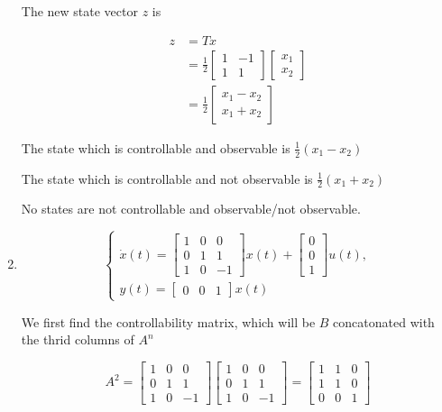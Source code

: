\documentclass{article}
\begin{document}
\begin{enumerate}[label=\alph*)]
The new state vector $z$ is

\begin{align*}
    z & = T x \\
    &= \frac{1}{2}
    \begin{bmatrix}
        1 & -1 \\
        1 & 1
    \end{bmatrix}
    \begin{bmatrix}
        x_1 \\
        x_2
    \end{bmatrix} \\
    &= \frac{1}{2}
    \begin{bmatrix}
        x_1 - x_2 \\
        x_1 + x_2
    \end{bmatrix}
\end{align*}

The state which is controllable and observable is $\frac{1}{2}(x_1 - x_2)$

The state which is controllable and not observable is $\frac{1}{2}(x_1 + x_2)$

No states are not controllable and observable/not observable.

\item 

\[
\left\{
    \begin{array}{l}
        \dot x(t) = 
        \begin{bmatrix}
            1 & 0 & 0 \\
            0 & 1 & 1 \\
            1 & 0 & -1 
        \end{bmatrix}
        x(t) + 
        \begin{bmatrix}
            0 \\
            0 \\
            1
        \end{bmatrix}
        u(t), \\
        y(t) = 
        \begin{bmatrix}
            0 & 0 & 1
        \end{bmatrix}
        x(t)
    \end{array}
\right.
\]

We first find the controllability matrix, which will be $B$ concatonated with the thrid columns of $A^n$

\[
A^2 = 
\begin{bmatrix}
    1 & 0 & 0 \\
    0 & 1 & 1 \\
    1 & 0 & -1 
\end{bmatrix}
\begin{bmatrix}
    1 & 0 & 0 \\
    0 & 1 & 1 \\
    1 & 0 & -1 
\end{bmatrix}
=
\begin{bmatrix}
    1 & 1 & 0 \\
    1 & 1 & 0 \\
    0 & 0 & 1 
\end{bmatrix}
\]


\end{enumerate}
\end{document}
